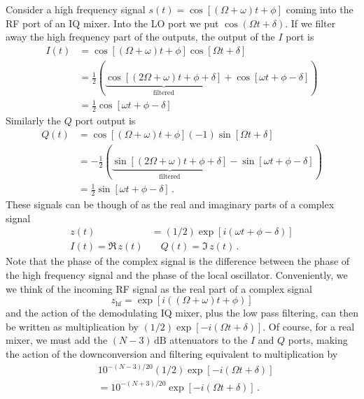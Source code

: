 
Consider a high frequency signal $s(t) = \cos [ (\Omega+\omega)t + \phi ]$ coming into the RF port of an IQ mixer.
Into the LO port we put $\cos(\Omega t + \delta)$.
If we filter away the high frequency part of the outputs, the output of the $I$ port is
\begin{align}
I(t) &= \cos [ (\Omega + \omega)t + \phi ] \cos [ \Omega t + \delta ] \nonumber \\
&= \frac{1}{2}\left( \underbrace{\cos [(2\Omega + \omega)t + \phi + \delta ]}_\text{filtered} + \cos [ \omega t + \phi - \delta ] \right) \nonumber \\
&= \frac{1}{2} \cos [ \omega t + \phi - \delta ]
\end{align}
Similarly the $Q$ port output is
\begin{align}
Q(t) &= \cos [ (\Omega + \omega)t + \phi ](-1)\sin [ \Omega t + \delta ] \nonumber \\
&= -\frac{1}{2}\left( \underbrace{\sin [(2\Omega + \omega)t + \phi + \delta ]}_\text{filtered} - \sin [ \omega t + \phi - \delta ] \right) \nonumber \\
&= \frac{1}{2} \sin [ \omega t + \phi - \delta ] \, .
\end{align}
These signals can be though of as the real and imaginary parts of a complex signal
\begin{align}
z(t) &= (1/2) \exp \left[i \left( \omega t + \phi - \delta \right) \right] \\
I(t) = \Re \, z(t) & \quad Q(t) = \Im \, z(t) \, .
\end{align}
Note that the phase of the complex signal is the difference between the phase of the high frequency signal and the phase of the local oscillator.
Conveniently, we we think of the incoming RF signal as the real part of a complex signal
\begin{equation}
z_{\textrm{hf}} = \exp \left[ i \left( \left( \Omega + \omega \right)t +\phi \right) \right]
\end{equation}
and the action of the demodulating IQ mixer, plus the low pass filtering, can then be written as multiplication by $(1/2) \exp \left[ -i( \Omega t + \delta ) \right]$.
Of course, for a real mixer, we must add the $(N-3)\,\text{dB}$ attenuators to the $I$ and $Q$ ports, making the action of the downconversion and filtering equivalent to multiplication by
\begin{align*}
& 10^{-(N-3)/20} (1/2) \exp \left[ -i (\Omega t + \delta) \right] \\
&= 10^{-(N+3)/20} \exp \left[ -i ( \Omega t + \delta) \right] \, .
\end{align*}

